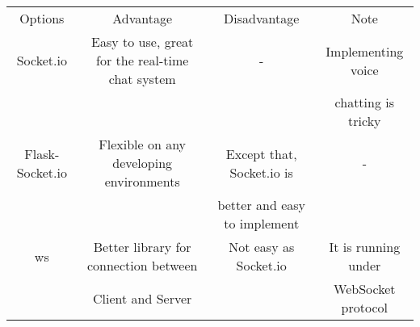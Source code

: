 \documentclass[10pt]{article}
\begin{document}
                \begin{center}
                \begin{tabular}{ |c|c|c|c| } \hline
                     Options & Advantage & Disadvantage & Note \\ 
                     Socket.io & Easy to use, great for the real-time chat system & - & Implementing voice \\ 
                     & & & chatting is tricky\\ 
                     Flask-Socket.io & Flexible on any developing environments & Except that, Socket.io is& -\\ 
                     &&better and easy to implement&\\
                     ws & Better library for connection between & Not easy as Socket.io  & It is running under\\ 
                     &Client and Server& & WebSocket protocol\\
                     \hline
                \end{tabular}
                \end{center}
              
\end{document}
